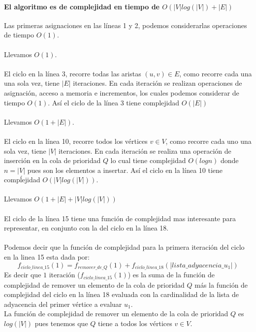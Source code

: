 \documentclass[12pt]{article}
\begin{document}
\paragraph{El algoritmo es de complejidad en tiempo de $O(|V|log(|V|) + |E|)$}
Las primeras asignaciones en las líneas 1 y 2, podemos considerarlas operaciones de tiempo $O(1)$.\\\\
Llevamos $O(1)$.\\\\
El ciclo en la línea 3, recorre todas las aristas $(u,v)\in E$, como recorre cada una una sola vez, tiene $|E|$ iteraciones. En cada iteración se realizan operaciones de asignación, acceso a memoria e incrementos, los cuales podemos considerar de tiempo $O(1)$. Así el ciclo de la línea 3 tiene complejidad $O(|E|)$\\\\
Llevamos $O(1 + |E|)$.\\\\
El ciclo en la línea 10, recorre todos los vértices $v\in V$, como recorre cada uno una sola vez, tiene $|V|$ iteraciones. En cada iteración se realiza una operación de inserción en la cola de prioridad $Q$ lo cual tiene complejidad $O(logn)$ donde $n=|V|$ pues son los elementos a insertar. Así el ciclo en la línea 10 tiene compĺejidad $O(|V|log(|V|))$.\\\\
Llevamos $O(1 + |E| + |V|log(|V|))$\\\\
El ciclo de la línea 15 tiene una función de complejidad mas interesante para representar, en conjunto con la del ciclo en la línea 18.\\\pagebreak\\
Podemos decir que la función de complejidad para la primera iteración del ciclo en la linea 15 esta dada por:\\
\begin{equation}
f_{ciclo\_linea\_15}(1)= f_{remover\_de\_Q}(1) + f_{ciclo\_linea\_18}(|lista\_adyacencia\_u_1|)
\end{equation}
Es decir que $1$ iteración ($f_{ciclo\_linea\_15}(1)$) es la suma de la función de complejidad de remover un elemento de la cola de prioridad $Q$ más la función de complejidad del ciclo en la línea 18 evaluada con la cardinalidad de la lista de adyacencia del primer vértice a evaluar $u_1$.\\
La función de complejidad de remover un elemento de la cola de prioridad $Q$ es $log(|V|)$ pues tenemos que $Q$ tiene a todos los vértices $v \in V$.\\
\end{document}
